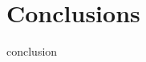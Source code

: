 \documentclass{sig-alternate}
\begin{document}
\section{Conclusions}
\label{sec:conclusion}
 {conclusion}



{ 


}




\end{document}
